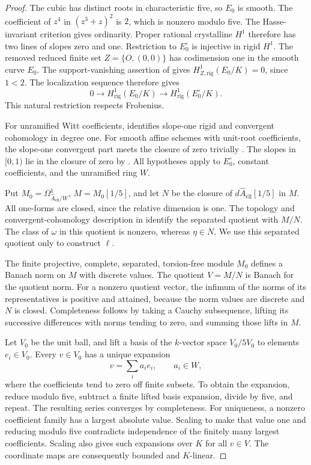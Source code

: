 \documentclass[11pt,a4paper]{amsart}
\numberwithin{equation}{section}
\theoremstyle{definition}
\theoremstyle{remark}
\newcommand{\Dtwowh}{\widehat}
\newcommand{\Dtworig}{\mathrm{rig}}
\begin{document}
\begin{proof}
The cubic has distinct roots in characteristic five, so \(E_0\) is
smooth. The coefficient of \(z^4\) in \((z^3+z)^2\) is \(2\),
which is nonzero modulo five.
The Hasse-invariant criterion
\cite[Theorem~V.4.1(a), p.~148]{SilvermanAEC2009} gives ordinarity.
Proper rational crystalline \(H^1\) therefore has two lines of
slopes zero and one.
Restriction to \(E_0^\circ\) is injective in rigid \(H^1\).
The removed reduced finite set \(Z=\{O,(0,0)\}\) has codimension
one in the smooth curve \(E_0\).
The support-vanishing assertion of
\cite[Theorem~1.1, third assertion, p.~63]{Petrequin2003}
gives \(H^1_{Z,\Dtworig}(E_0/K)=0\), since \(1<2\).
The localization sequence
\cite[Proposition~1.3, p.~64]{Petrequin2003} therefore gives
\[
 0\longrightarrow H^1_\Dtworig(E_0/K)
       \longrightarrow H^1_\Dtworig(E_0^\circ/K).
\]
This natural restriction respects Frobenius.

For unramified Witt coefficients,
\cite[Theorem~7.3.1]{CaroDAddezio2025} identifies slope-one rigid and
convergent cohomology in degree one.
For smooth affine schemes with unit-root coefficients, the
slope-one convergent part meets the closure of zero trivially
\cite[Theorem~7.3.6]{CaroDAddezio2025}.
The slopes in \([0,1)\) lie in the closure of zero by
\cite[Theorem~7.2.1]{CaroDAddezio2025}.
All hypotheses apply to \(E_0^\circ\), constant coefficients, and
the unramified ring \(W\).

Put \(M_0=\Omega^1_{\Dtwowh A_{\mathrm{ell}}/W}\), \(M=M_0[1/5]\),
and let \(N\) be the closure of
\(d\Dtwowh A_{\mathrm{ell}}[1/5]\) in \(M\).
All one-forms are closed, since the relative dimension is one.
The topology and convergent-cohomology description in
\cite[Definition~7.1.1]{CaroDAddezio2025} identify the separated
quotient with \(M/N\).
The class of \(\omega\) in this quotient is nonzero, whereas
\(\eta\in N\).
We use this separated quotient only to construct \(\ell\).

The finite projective, complete, separated, torsion-free module
\(M_0\) defines a Banach norm on \(M\) with discrete values.
The quotient \(V=M/N\) is Banach for the quotient norm.
For a nonzero quotient vector, the infimum of the norms of its
representatives is positive and attained, because the norm values
are discrete and \(N\) is closed.
Completeness follows by taking a Cauchy subsequence, lifting its
successive differences with norms tending to zero, and summing
those lifts in \(M\).

Let \(V_0\) be the unit ball, and lift a basis of the \(k\)-vector
space \(V_0/5V_0\) to elements \(e_i\in V_0\).
Every \(v\in V_0\) has a unique expansion
\[
 v=\sum_i a_ie_i,\qquad a_i\in W,
\]
where the coefficients tend to zero off finite subsets.
To obtain the expansion, reduce modulo five, subtract a finite
lifted basis expansion, divide by five, and repeat.
The resulting series converges by completeness.
For uniqueness, a nonzero coefficient family has a largest absolute
value. Scaling to make that value one and reducing modulo five
contradicts independence of the finitely many largest coefficients.
Scaling also gives such expansions over \(K\) for all \(v\in V\).
The coordinate maps are consequently bounded and \(K\)-linear.


\end{proof}
\end{document}

